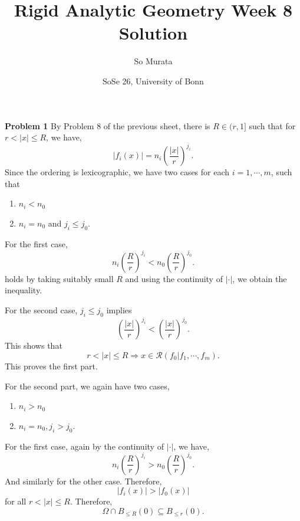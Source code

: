 \documentclass[10pt]{article}
\title{Rigid Analytic Geometry Week 8 Solution}
\author{So Murata}
\date{SoSe 26, University of Bonn}
\newcommand{\ab}[1]{\vert #1 \vert}
\begin{document}
\maketitle

\par\textbf{Problem 1}
By Problem 8 of the previous sheet, there is $R\in (r,1]$ such that for $r<\ab{x}\leq R$, we have,
\begin{equation*}
    \ab{f_i(x)}=n_i\left({\frac {\ab{x}} {r}}\right)^{j_i}.
\end{equation*}
Since the ordering is lexicographic, we have two cases for each $i=1,\cdots,m$, such that
\begin{enumerate}
    \item $n_i<n_0$
    \item $n_i=n_0$ and $j_i\leq j_0$.
\end{enumerate}
For the first case, 
\begin{equation*}
    n_i\left({\frac R r}\right)^{j_i}<n_0\left({\frac R r}\right)^{j_0}.
\end{equation*}
holds by taking suitably small $R$ and using the continuity of $\ab{\cdot}$, we obtain the inequality.
\par For the second case, $j_i\leq j_0$ implies 
\begin{equation*}
    \left({\frac {\ab{x}} {r}}\right)^{j_i}<\left({\frac {\ab{x}} {r}}\right)^{j_0}.
\end{equation*}
This shows that 
\begin{equation*}
    r<\ab{x}\leq R\Rightarrow x\in\mathcal{R}(f_0|f_1,\cdots,f_m).
\end{equation*}
This proves the first part.
\par For the second part, we again have two cases,
\begin{enumerate}
    \item $n_i>n_0$
    \item $n_i=n_0,j_i>j_0$.
\end{enumerate}
For the first case, again by the continuity of $\ab{\cdot}$, we have,
\begin{equation*}
    n_i\left({\frac R r}\right)^{j_i}>n_0\left({\frac R r}\right)^{j_0}.
\end{equation*}
And similarly for the other case. Therefore,
\begin{equation*}
    \vert f_i(x)\vert>\ab{f_0(x)}
\end{equation*}
for all $r<\ab{x}\leq R$. Therefore,
\begin{equation*}
    \Omega\cap B_{\leq R}(0)\subseteq B_{\leq r}(0).
\end{equation*}
\end{document}
